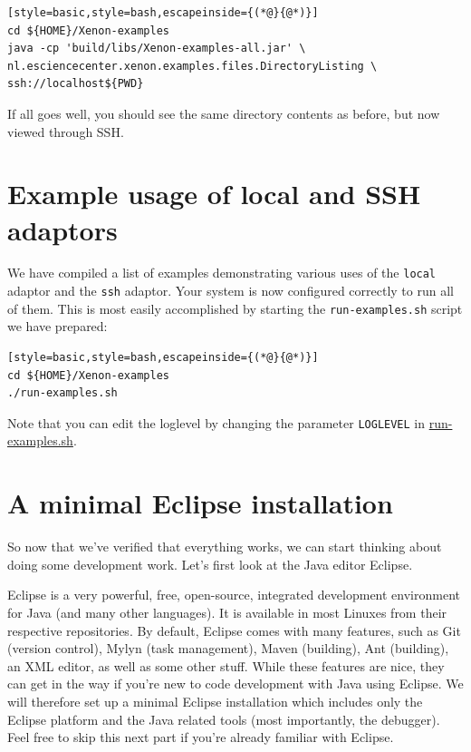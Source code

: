 \documentclass[12pt, a4paper, twoside, openany, titlepage]{book}
\begin{document}
\begin{lstlisting}[style=basic,style=bash,escapeinside={(*@}{@*)}]
cd ${HOME}/Xenon-examples
java -cp 'build/libs/Xenon-examples-all.jar' \
nl.esciencecenter.xenon.examples.files.DirectoryListing \
ssh://localhost${PWD}
\end{lstlisting} %

If all goes well, you should see the same directory contents as before, but now viewed through SSH.

\section{Example usage of local and SSH adaptors}

We have compiled a list of examples demonstrating various uses of the \texttt{local} adaptor and the \texttt{ssh} adaptor. Your system is now configured correctly to run all of them. This is most easily accomplished by starting the \texttt{run-examples.sh} script we have prepared:
\begin{lstlisting}[style=basic,style=bash,escapeinside={(*@}{@*)}]
cd ${HOME}/Xenon-examples
./run-examples.sh
\end{lstlisting} %

Note that you can edit the loglevel by changing the parameter \texttt{LOGLEVEL} in \url{run-examples.sh}.





\section{A minimal Eclipse installation}

So now that we've verified that everything works, we can start thinking about doing some development work. Let's first look at the Java editor Eclipse.

Eclipse\index{Eclipse} is a very powerful, free, open-source, integrated development environment for Java (and many other languages). It is available in most Linuxes from their respective repositories. By default, Eclipse comes with many features, such as Git (version control), Mylyn (task management), Maven (building), Ant (building), an XML editor, as well as some other stuff. While these features are nice, they can get in the way if you're new to code development with Java using Eclipse. We will therefore set up a minimal Eclipse installation which includes only the Eclipse platform and the Java related tools (most importantly, the debugger). Feel free to skip this next part if you're already familiar with Eclipse.
\end{document}
